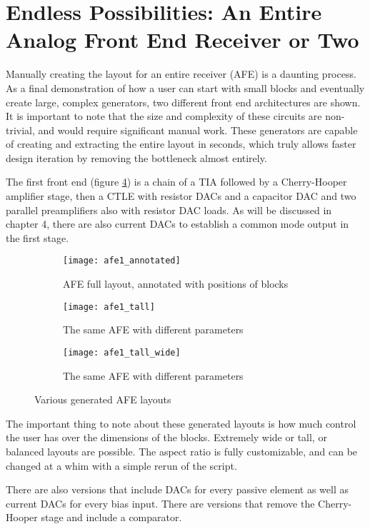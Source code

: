 \section{Endless Possibilities: An Entire Analog Front End Receiver or Two}
Manually creating the layout for an entire receiver (AFE) is a daunting process. As a final demonstration of how a user can start with small blocks and eventually create large, complex generators, two different front end architectures are shown. It is important to note that the size and complexity of these circuits are non-trivial, and would require significant manual work. These generators are capable of creating and extracting the entire layout in seconds, which truly allows faster design iteration by removing the bottleneck almost entirely. 

The first front end (figure \ref{fig:afe1}) is a chain of a TIA followed by a Cherry-Hooper amplifier stage, then a CTLE with resistor DACs and a capacitor DAC and two parallel preamplifiers also with resistor DAC loads. As will be discussed in chapter 4, there are also current DACs to establish a common mode output in the first stage. 
\begin{figure}[h]
\centering
\begin{subfigure}{1\linewidth}
  \centering
  \texttt{[image: afe1\_annotated]}
  \caption{AFE full layout, annotated with positions of blocks}
  \label{fig:sfig1}
\end{subfigure}
\begin{subfigure}{.8\linewidth}
  \centering
\texttt{[image: afe1\_tall]}
  \caption{The same AFE with different parameters}
  \label{fig:sfig2}
\end{subfigure}
\begin{subfigure}{.8\linewidth}
  \centering
\texttt{[image: afe1\_tall\_wide]}
  \caption{The same AFE with different parameters}
  \label{fig:sfig2}
\end{subfigure}
\caption{Various generated AFE layouts}
\label{fig:afe1}
\end{figure}
The important thing to note about these generated layouts is how much control the user has over the dimensions of the blocks. Extremely wide or tall, or balanced layouts are possible. The aspect ratio is fully customizable, and can be changed at a whim with a simple rerun of the script.

There are also versions that include DACs for every passive element as well as current DACs for every bias input. There are versions that remove the Cherry-Hooper stage and include a comparator. 

